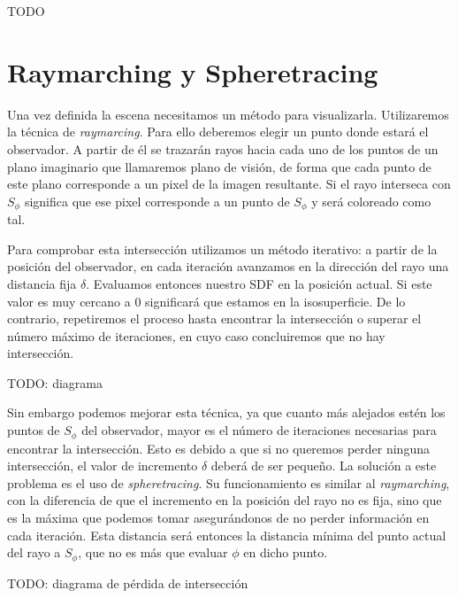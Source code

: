 TODO


\section{Raymarching y Spheretracing}
Una vez definida la escena necesitamos un método para visualizarla. Utilizaremos la técnica de \textit{raymarcing}. Para ello deberemos elegir un punto donde estará el observador. A partir de él se trazarán rayos hacia cada uno de los puntos de un plano imaginario que llamaremos plano de visión, de forma que cada punto de este plano corresponde a un pixel de la imagen resultante. Si el rayo interseca con $S_\phi$ significa que ese pixel corresponde a un punto de $S_\phi$ y será coloreado como tal.\newline

Para comprobar esta intersección utilizamos un método iterativo: a partir de la posición del observador, en cada iteración avanzamos en la dirección del rayo una distancia fija $\delta$. Evaluamos entonces nuestro SDF en la posición actual. Si este valor es muy cercano a 0 significará que estamos en la isosuperficie. De lo contrario, repetiremos el proceso hasta encontrar la intersección o superar el número máximo de iteraciones, en cuyo caso concluiremos que no hay intersección.\newline

TODO: diagrama

Sin embargo podemos mejorar esta técnica, ya que cuanto más alejados estén los puntos de $S_\phi$ del observador, mayor es el número de iteraciones necesarias para encontrar la intersección. Esto es debido a que si no queremos perder ninguna intersección, el valor de incremento $\delta$ deberá de ser pequeño. La solución a este problema es el uso de \textit{spheretracing}. Su funcionamiento es similar al \textit{raymarching}, con la diferencia de que el incremento en la posición del rayo no es fija, sino que es la máxima que podemos tomar asegurándonos de no perder información en cada iteración. Esta distancia será entonces la distancia mínima del punto actual del rayo a $S_\phi$, que no es más que evaluar $\phi$ en dicho punto.\newline

TODO: diagrama de pérdida de intersección

